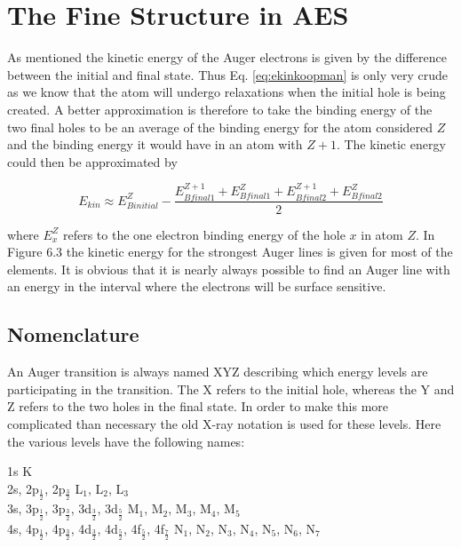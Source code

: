 \section{The Fine Structure in AES}
As mentioned the kinetic energy of the Auger electrons is given by the difference between the initial and final state. Thus Eq. \eqref{eq:ekinkoopman} is only very crude as we know that the atom will undergo relaxations when the initial  hole is being created. A better approximation is therefore to take the binding energy of the two final holes to be an average of the binding energy for the atom considered $Z$ and the binding energy it would have in an atom with $Z+1$. The kinetic energy could then be approximated by

\begin{equation}
E_{kin}\approx E_{Binitial}^Z-\frac{E_{Bfinal1}^{Z+1}+E_{Bfinal1}^Z+E_{Bfinal2}^{Z+1}+E_{Bfinal2}^Z}{2}
\end{equation}

where $E_x^Z$ refers to the one electron binding energy of the hole $x$ in atom $Z$. In Figure 6.3 the kinetic energy for the strongest Auger lines is given for most of the elements. It is obvious that it is nearly always possible to find an Auger line with an energy in the interval where the electrons will be surface sensitive.\\

\subsection{Nomenclature}
An Auger transition is always named XYZ describing which energy levels are participating in the transition. The X refers to the initial hole, whereas the Y and Z refers to the two holes in the final state. In order to make this more complicated than necessary the old X-ray  notation is used for these levels. Here the various levels have the following names:

\vspace{0.5cm}

             \noindent   1s   \hfill   K\\   2s,   2p$_{\frac{1}{2}}$,
          2p$_{\frac{3}{2}}$ \hfill L$_1$,  L$_2$,  L$_3$\\  3s,
          3p$_{\frac{1}{2}}$, 3p$_{\frac{3}{2}}$,  3d$_{\frac{3}{2}}$,
          3d$_{\frac{5}{2}}$   \hfill   M$_1$,   M$_2$,   M$_3$,
          M$_4$,       M$_5$\\       4s,       4p$_{\frac{1}{2}}$,
          4p$_{\frac{3}{2}}$, 4d$_{\frac{3}{2}}$,  4d$_{\frac{5}{2}}$,
          4f$_{\frac{5}{2}}$,   4f$_{\frac{7}{2}}$   \hfill   N$_1$,
          N$_2$,  N$_3$,  N$_4$,  N$_5$,  N$_6$,   N$_7$\\


